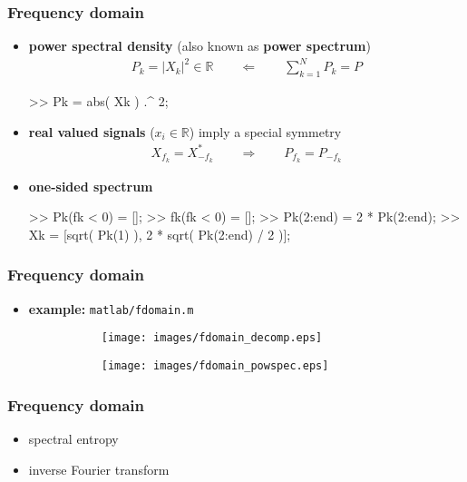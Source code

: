 \begin{frame}[fragile]
	\frametitle{Frequency domain}
	\begin{itemize}
		\item \textbf{power spectral density} (also known as \textbf{power spectrum})
			\begin{align*}
				P_k=\lvert X_k\rvert^2\in\mathbb R\qquad\Leftarrow\qquad\sum_{k=1}^NP_k=P
			\end{align*}
			\begin{code}
>> Pk = abs( Xk ) .^ 2; \color{medium}%
			\end{code}
		\item \textbf{real valued signals} ($x_i\in\mathbb R$) imply a special symmetry
			\begin{align*}
				X_{f_k}=X_{-f_k}^*\qquad\Rightarrow\qquad P_{f_k}=P_{-f_k}
			\end{align*}
		\item \textbf{one-sided spectrum}
			\begin{code}
>> Pk(fk < 0) = []; \color{medium}%
>> fk(fk < 0) = [];
>> Pk(2:end) = 2 * Pk(2:end); \color{medium}%
>> Xk = [sqrt( Pk(1) ), 2 * sqrt( Pk(2:end) / 2 )];
			\end{code}
	\end{itemize}
\end{frame}

\begin{frame}
	\frametitle{Frequency domain}
	\begin{itemize}
		\item \textbf{example:} \texttt{matlab/fdomain.m}
			\begin{figure}
				\centering
				\begin{subfigure}[c]{0.48\linewidth}
					\texttt{[image: images/fdomain\_decomp.eps]}
				\end{subfigure}
				\hspace{0.01\linewidth}
				\begin{subfigure}[c]{0.48\linewidth}
					\texttt{[image: images/fdomain\_powspec.eps]}
				\end{subfigure}
			\end{figure}
	\end{itemize}
\end{frame}

\begin{frame}
	\frametitle{Frequency domain}
	\begin{itemize}
		\item spectral entropy
		\item inverse Fourier transform
	\end{itemize}
\end{frame}

